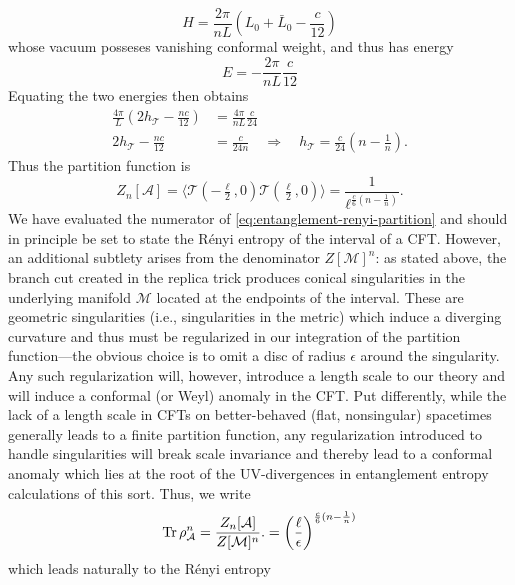 \documentclass{report}
\begin{document}
\begin{equation*}
	H = \frac{2\pi}{nL} \left(	L_0 + \bar{L}_0 - \frac{c}{12}\right)
\end{equation*}
whose vacuum posseses vanishing conformal weight, and thus has energy 
\begin{equation*}
	E = -\frac{2\pi}{nL}\frac{c}{12}
\end{equation*}
Equating the two energies then obtains 
\begin{align*}
	\frac{4\pi}{L} \left(2h_{\mathcal{T}} - \frac{nc}{12}\right)
		&= \frac{4\pi}{nL} \frac{c}{24} \\
	 2h_{\mathcal{T}} - \frac{nc}{12} &= \frac{c}{24 n}
	\quad\Longrightarrow \quad
	h_{\mathcal{T}}
		= \frac{c}{24}(n - \tfrac{1}{n}).
\end{align*}
Thus the partition function is 
\begin{equation*}
	Z_n[\mathcal{A}]
		= \langle \mathcal{T}(-\tfrac{\ell}{2}, 0) \mathcal{T}(\tfrac{\ell}{2}, 0) \rangle
		= \frac{1}{\ell^{\frac{c}{6}(n-\frac{1}{n})}}.
\end{equation*}
We have evaluated the numerator of \cref{eq:entanglement-renyi-partition} 
and should in principle be set to state the R\'enyi entropy of the interval of a 
CFT. However, an additional subtlety arises from the denominator $ Z[\mathcal{M}]^n $: 
as stated above, the branch cut created in the replica trick produces conical 
singularities in the underlying manifold $ \mathcal{M} $ located at the endpoints 
of the interval. These are geometric singularities (i.e., singularities in the 
metric) which induce a diverging curvature and thus must be regularized in our 
integration of the partition function---the obvious choice is to omit a
disc of radius $ \epsilon $ around the singularity. Any such regularization will, 
however, introduce a length scale to our theory and will induce a conformal (or
Weyl) anomaly in the CFT. Put differently, while the lack of a length scale 
in CFTs on better-behaved (flat, nonsingular) spacetimes generally leads to a 
finite partition function, any regularization introduced to handle singularities
will break scale invariance and thereby lead to a conformal anomaly which lies 
at the root of the UV-divergences in entanglement entropy calculations of this 
sort.
Thus, we write 
\begin{equation*}
	\Tr \rho^n_{\mathcal{A}} 
		= \frac{Z_n[\mathcal{A}]}{Z[\mathcal{M}]^n}.
		=  \left(\frac{\ell}{\epsilon}\right)^{\frac{c}{6}(n- \frac{1}{n})}
\end{equation*}
which leads naturally to the R\'enyi entropy
\end{document}
